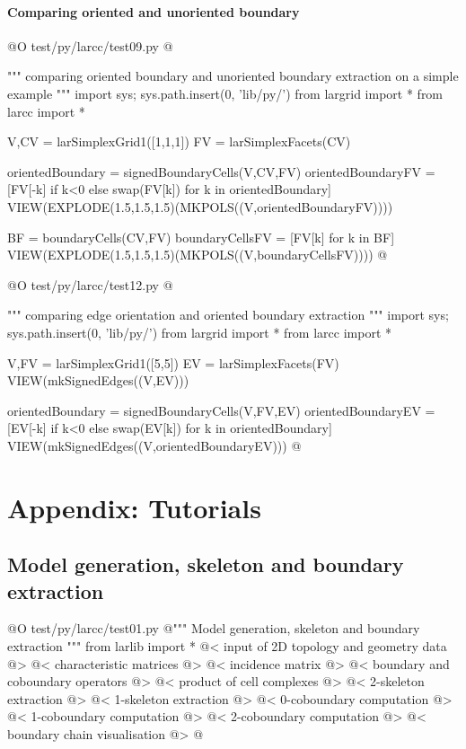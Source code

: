 \documentclass[11pt,oneside]{article}    %
\begin{document}
\paragraph{Comparing oriented and unoriented boundary}

@O test/py/larcc/test09.py
@{""" comparing oriented boundary and unoriented boundary extraction on a simple example """
import sys; sys.path.insert(0, 'lib/py/')
from largrid import *
from larcc import *

V,CV = larSimplexGrid1([1,1,1])
FV = larSimplexFacets(CV)

orientedBoundary = signedBoundaryCells(V,CV,FV)
orientedBoundaryFV = [FV[-k] if k<0 else swap(FV[k]) for k in orientedBoundary]
VIEW(EXPLODE(1.5,1.5,1.5)(MKPOLS((V,orientedBoundaryFV))))

BF = boundaryCells(CV,FV)
boundaryCellsFV = [FV[k] for k in BF]
VIEW(EXPLODE(1.5,1.5,1.5)(MKPOLS((V,boundaryCellsFV))))
@}

@O test/py/larcc/test12.py
@{""" comparing edge orientation and oriented boundary extraction """
import sys; sys.path.insert(0, 'lib/py/')
from largrid import *
from larcc import *

V,FV = larSimplexGrid1([5,5])
EV = larSimplexFacets(FV)
VIEW(mkSignedEdges((V,EV)))

orientedBoundary = signedBoundaryCells(V,FV,EV)
orientedBoundaryEV = [EV[-k] if k<0 else swap(EV[k]) for k in orientedBoundary]
VIEW(mkSignedEdges((V,orientedBoundaryEV)))
@}



\appendix

\section{Appendix: Tutorials}


\subsection{Model generation, skeleton and boundary extraction}

@O test/py/larcc/test01.py
@{""" Model generation, skeleton and boundary extraction """
from larlib import *
@< input of 2D topology and geometry data @>
@< characteristic matrices @>
@< incidence matrix @>
@< boundary and coboundary operators @>
@< product of cell complexes @>
@< 2-skeleton extraction @>
@< 1-skeleton extraction  @>
@< 0-coboundary computation @>
@< 1-coboundary computation @>
@< 2-coboundary computation @>
@< boundary chain visualisation @>
@}
\end{document}
